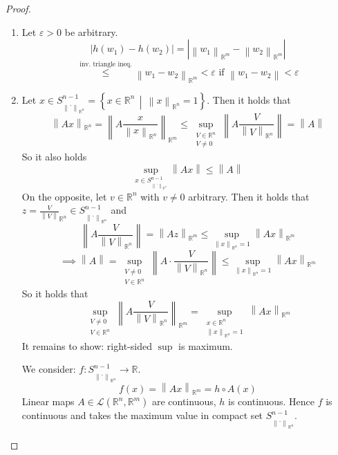 \documentclass[a4paper,landscape,twocolumn]{article}
\theoremstyle{definition}
\newcommand\setdef[2]{\left\{#1\,\middle|\,#2\right\}}
\newcommand\abs[1]{\left|#1\right|}
\newcommand\norm[1]{\left\|#1\right\|}
\begin{document}
\begin{proof}
  \begin{enumerate}
  \item
    Let $\varepsilon > 0$ be arbitrary.
    \[ \abs{h(w_1) - h(w_2)} = \abs{\norm{w_1}_{\mathbb R^m} - \norm{w_2}_{\mathbb R^m}} \]
    \[ \overset{\text{inv. triangle ineq.}}{\leq} \norm{w_1 - w_2}_{\mathbb R^m} < \varepsilon \text{ if } \norm{w_1 - w_2} < \varepsilon \]
  \item
    Let $x \in S^{n-1}_{\norm{.}_{\mathbb R^n}} = \setdef{x \in \mathbb R^n}{\norm{x}_{\mathbb R^n} = 1}$.
    Then it holds that
    \[ \norm{Ax}_{\mathbb R^n} = \norm{A \frac{x}{\norm{x}_{\mathbb R^n}}}_{\mathbb R^m}
       \leq \sup_{\substack{V \in \mathbb R^n \\ V \neq 0}} \norm{A \frac{V}{\norm{V}_{\mathbb R^n}}} = \norm{A} \]
    So it also holds
    \[ \sup_{x \in S^{n-1}_{\norm{.}_{\mathbb R^n}}} \norm{Ax} \leq \norm{A} \]
    On the opposite, let $v \in \mathbb R^n$ with $v \neq 0$ arbitrary.
    Then it holds that $z = \frac{V}{\norm{V}}_{\mathbb R^n} \in S^{n-1}_{\norm{.}_{\mathbb R^n}}$
    and
    \[ \norm{A \frac{V}{\norm{V}_{\mathbb R^n}}} = \norm{A z}_{\mathbb R^m} \leq \sup_{\norm{x}_{\mathbb R^n} = 1} \norm{Ax}_{\mathbb R^m} \]
    \[ \implies \norm{A} = \sup_{\substack{V \neq 0 \\ V \in \mathbb R^n}} \norm{A \cdot \frac{V}{\norm{V}_{\mathbb R^n}}} \leq \sup_{\norm{x}_{\mathbb R^n} = 1} \norm{Ax}_{\mathbb R^m} \]
    So it holds that
    \[ \sup_{\substack{V \neq 0 \\ V \in \mathbb R^n}} \norm{A \frac{V}{\norm{V}_{\mathbb R^n}}}_{\mathbb R^m} = \sup_{\substack{x \in \mathbb R^n \\ \norm{x}_{\mathbb R^n} = 1}} \norm{Ax}_{\mathbb R^m} \]
    It remains to show: right-sided $\sup$ is maximum.

    We consider: $f: S^{n-1}_{\norm{.}_{\mathbb R^n}} \to \mathbb R$.
    \[ f(x) = \norm{Ax}_{\mathbb R^m} = h \circ A(x) \]
    Linear maps $A \in \mathcal{L}(\mathbb R^n, \mathbb R^m)$ are continuous,
    $h$ is continuous. Hence $f$ is continuous and takes the maximum value in compact set $S^{n-1}_{\norm{.}_{\mathbb R^n}}$.
  \end{enumerate}
\end{proof}
\end{document}
